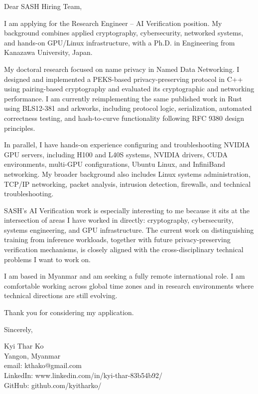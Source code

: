\documentclass[11pt, a4paper]{article}
\begin{document}
	\pagestyle{fancy}
Dear SASH Hiring Team,

I am applying for the Research Engineer – AI Verification position. My background combines applied cryptography, cybersecurity, networked systems, and hands-on GPU/Linux infrastructure, with a Ph.D. in Engineering from Kanazawa University, Japan.

My doctoral research focused on name privacy in Named Data Networking. I designed and implemented a PEKS-based privacy-preserving protocol in C++ using pairing-based cryptography and evaluated its cryptographic and networking performance. I am currently reimplementing the same published work in Rust using BLS12-381 and arkworks, including protocol logic, serialization, automated correctness testing, and hash-to-curve functionality following RFC 9380 design principles.

In parallel, I have hands-on experience configuring and troubleshooting NVIDIA GPU servers, including H100 and L40S systems, NVIDIA drivers, CUDA environments, multi-GPU configurations, Ubuntu Linux, and InfiniBand networking. My broader background also includes Linux systems administration, TCP/IP networking, packet analysis, intrusion detection, firewalls, and technical troubleshooting.

SASH’s AI Verification work is especially interesting to me because it sits at the intersection of areas I have worked in directly: cryptography, cybersecurity, systems engineering, and GPU infrastructure. The current work on distinguishing training from inference workloads, together with future privacy-preserving verification mechanisms, is closely aligned with the cross-disciplinary technical problems I want to work on.

I am based in Myanmar and am seeking a fully remote international role. I am comfortable working across global time zones and in research environments where technical directions are still evolving.

Thank you for considering my application.

Sincerely,

Kyi Thar Ko\\
Yangon, Myanmar \\
email: kthako@gmail.com \\
LinkedIn: www.linkedin.com/in/kyi-thar-83b54b92/\\
GitHub: github.com/kyitharko/
\end{document}
